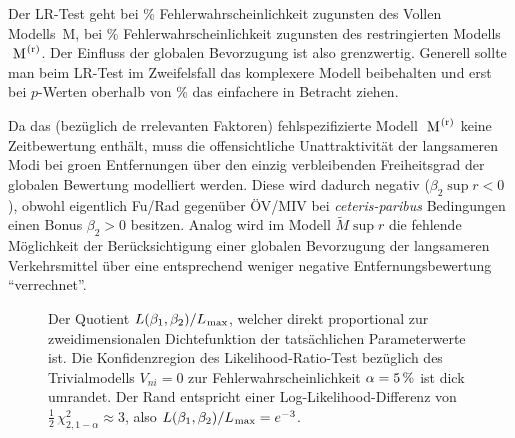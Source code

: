 Der LR-Test geht bei \unit[10]{\%} Fehlerwahrscheinlichkeit
zugunsten des Vollen Modells~M, bei \unit[5]{\%} Fehlerwahrscheinlichkeit
zugunsten des restringierten Modells ${\mbox{ M}}^{\!\!{\mbox{ \scriptsize{(r)}}}}$. Der Einfluss der
globalen Bevorzugung ist also grenzwertig. Generell sollte man beim LR-Test im
Zweifelsfall das komplexere Modell beibehalten und erst bei $p$-Werten oberhalb von
\unit[10]{\%} das einfachere in Betracht ziehen.  
\eenum

\vspace{-1.5em}

{\scriptsize Da das (bez\"uglich de rrelevanten Faktoren) 
fehlspezifizierte Modell ${\mbox{ M}}^{\!\!{\mbox{ \scriptsize{(r)}}}}$ keine Zeitbewertung
  enth\"alt, muss die offensichtliche Unattraktivit\"at der langsameren Modi 
bei gro\3en Entfernungen
  \"uber den einzig verbleibenden Freiheitsgrad der globalen Bewertung
  modelliert werden. Diese wird dadurch negativ ($\beta_2\sup{r}<0$), obwohl eigentlich Fu\3/Rad
  gegen\"uber \"OV/MIV bei \emph{ceteris-paribus} Bedingungen einen Bonus
  $\beta_2>0$ besitzen. Analog wird im Modell $\tilde{M}\sup{r}$ die fehlende
  M\"oglichkeit der Ber\"ucksichtigung einer globalen Bevorzugung der
  langsameren Verkehrsmittel \"uber eine entsprechend weniger negative
  Entfernungsbewertung ``verrechnet''.
}


\begin{figure}[t!]
\vspace{-2em}  
 \vspace{-4em}  
  \caption{\label{fig:BNL_kalib_L}Der Quotient
$L(\beta_1,\beta_2)/L_{\!\!{\mbox{ \scriptsize{max}}}}$, welcher direkt proportional zur zweidimensionalen
Dichtefunktion der tats\"achlichen Parameterwerte ist. Die
Konfidenzregion des Likelihood-Ratio-Test bez\"uglich des
Trivialmodells $V_{ni}=0$ zur Fehlerwahrscheinlichkeit
$\alpha=\unit[5]{\%}$ ist dick umrandet. Der Rand entspricht einer
Log-Likelihood-Differenz von $\frac{1}{2} \, \chi^2_{2,1-\alpha}\approx 3$, also 
$L(\beta_1,\beta_2)/L_{\!\!{\mbox{ \scriptsize{max}}}}=e^{-3}$.
}
\end{figure}


